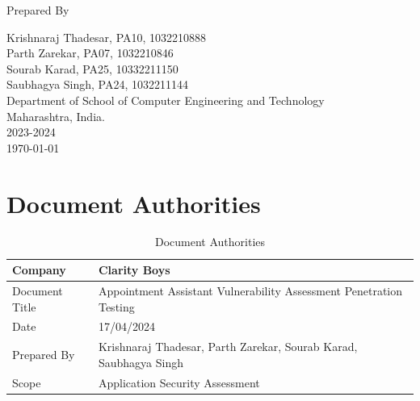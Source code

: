 \documentclass[openany]{report}
\begin{document}
\begin{titlepage}
    Prepared By
    \vspace{0.5\baselineskip} %

    \Large{
        Krishnaraj Thadesar, PA10, 1032210888\\
        Parth Zarekar, PA07, 1032210846\\
        Sourab Karad, PA25, 10332211150\\
        Saubhagya Singh, PA24, 1032211144\\
    }
    \vspace{0.5\baselineskip} %
    \LARGE{
        Department of School of Computer Engineering and Technology\\
        Maharashtra, India.\\
        2023-2024\\
    }
    \today

\end{titlepage}


\tableofcontents
\thispagestyle{empty}

\clearpage
\listoffigures
\clearpage
\listoftables
\clearpage


\thispagestyle{empty}
\clearpage


\chapter{Document Authorities}
\begin{table}[H]
    \begin{tabular}{|l|l|}
        \hline
        \rowcolor[HTML]{6434FC}
        {\color[HTML]{000000} \textbf{Company}} & {\color[HTML]{000000} \textbf{Clarity Boys}}                                              \\ \hline
        \rowcolor[HTML]{9698ED}
        {\color[HTML]{000000} Document Title}   & {\color[HTML]{000000} Appointment Assistant Vulnerability Assessment Penetration Testing} \\ \hline
        Date                                    & 17/04/2024                                                                                \\ \hline
        Prepared By                             & Krishnaraj Thadesar, Parth Zarekar, Sourab Karad, Saubhagya Singh                         \\ \hline
        Scope                                   & Application Security Assessment                                                           \\ \hline
    \end{tabular}
    \caption{Document Authorities}
\end{table}
\end{document}
